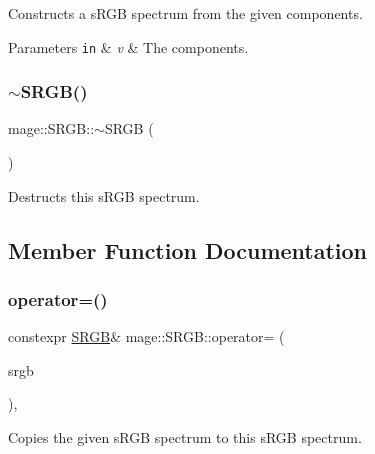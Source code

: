 Constructs a s\+R\+GB spectrum from the given components.


\begin{DoxyParams}[1]{Parameters}
\mbox{\tt in}  & {\em v} & The components. \\
\hline
\end{DoxyParams}
\hypertarget{structmage_1_1_s_r_g_b_aa5bb0738c6026da6c3e4f54869c52cbc}{}\label{structmage_1_1_s_r_g_b_aa5bb0738c6026da6c3e4f54869c52cbc} 
\subsubsection{\texorpdfstring{$\sim$\+S\+R\+G\+B()}{~SRGB()}}
{\footnotesize\ttfamily mage\+::\+S\+R\+G\+B\+::$\sim$\+S\+R\+GB (\begin{DoxyParamCaption}{ }\end{DoxyParamCaption})\hspace{0.3cm}{\ttfamily [default]}}

Destructs this s\+R\+GB spectrum. 

\subsection{Member Function Documentation}
\hypertarget{structmage_1_1_s_r_g_b_ab4feb5cd04c21c03d2278468e3241562}{}\label{structmage_1_1_s_r_g_b_ab4feb5cd04c21c03d2278468e3241562} 
\subsubsection{\texorpdfstring{operator=()}{operator=()}\hspace{0.1cm}{\footnotesize\ttfamily [1/2]}}
{\footnotesize\ttfamily constexpr \hyperlink{structmage_1_1_s_r_g_b}{S\+R\+GB}\& mage\+::\+S\+R\+G\+B\+::operator= (\begin{DoxyParamCaption}\item[{const \hyperlink{structmage_1_1_s_r_g_b}{S\+R\+GB} \&}]{srgb }\end{DoxyParamCaption})\hspace{0.3cm}{\ttfamily [default]}, {\ttfamily [noexcept]}}

Copies the given s\+R\+GB spectrum to this s\+R\+GB spectrum.


